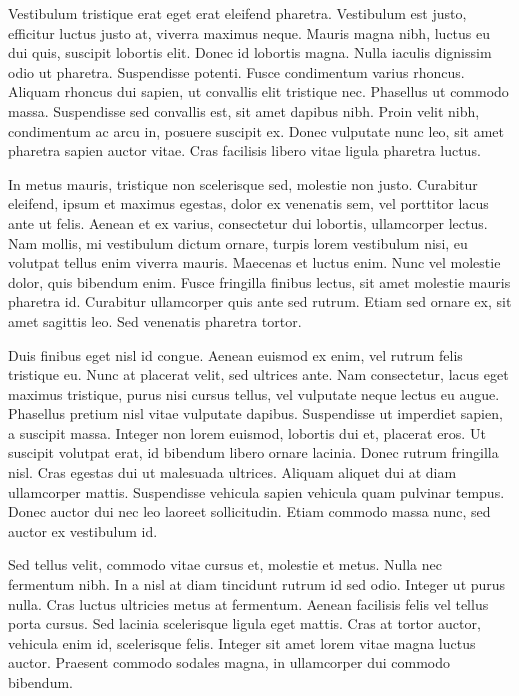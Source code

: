 Vestibulum tristique erat eget erat eleifend pharetra. Vestibulum est justo,
efficitur luctus justo at, viverra maximus neque. Mauris magna nibh, luctus eu
dui quis, suscipit lobortis elit. Donec id lobortis magna. Nulla iaculis
dignissim odio ut pharetra. Suspendisse potenti. Fusce condimentum varius
rhoncus. Aliquam rhoncus dui sapien, ut convallis elit tristique nec. Phasellus
ut commodo massa. Suspendisse sed convallis est, sit amet dapibus nibh. Proin
velit nibh, condimentum ac arcu in, posuere suscipit ex. Donec vulputate nunc
leo, sit amet pharetra sapien auctor vitae. Cras facilisis libero vitae ligula
pharetra luctus.

In metus mauris, tristique non scelerisque sed, molestie non justo. Curabitur
eleifend, ipsum et maximus egestas, dolor ex venenatis sem, vel porttitor lacus
ante ut felis. Aenean et ex varius, consectetur dui lobortis, ullamcorper
lectus. Nam mollis, mi vestibulum dictum ornare, turpis lorem vestibulum nisi,
eu volutpat tellus enim viverra mauris. Maecenas et luctus enim. Nunc vel
molestie dolor, quis bibendum enim. Fusce fringilla finibus lectus, sit amet
molestie mauris pharetra id. Curabitur ullamcorper quis ante sed rutrum. Etiam
sed ornare ex, sit amet sagittis leo. Sed venenatis pharetra tortor.

Duis finibus eget nisl id congue. Aenean euismod ex enim, vel rutrum felis
tristique eu. Nunc at placerat velit, sed ultrices ante. Nam consectetur, lacus
eget maximus tristique, purus nisi cursus tellus, vel vulputate neque lectus eu
augue. Phasellus pretium nisl vitae vulputate dapibus. Suspendisse ut imperdiet
sapien, a suscipit massa. Integer non lorem euismod, lobortis dui et, placerat
eros. Ut suscipit volutpat erat, id bibendum libero ornare lacinia. Donec
rutrum fringilla nisl. Cras egestas dui ut malesuada ultrices. Aliquam aliquet
dui at diam ullamcorper mattis. Suspendisse vehicula sapien vehicula quam
pulvinar tempus. Donec auctor dui nec leo laoreet sollicitudin. Etiam commodo
massa nunc, sed auctor ex vestibulum id.

Sed tellus velit, commodo vitae cursus et, molestie et metus. Nulla nec
fermentum nibh. In a nisl at diam tincidunt rutrum id sed odio. Integer ut
purus nulla. Cras luctus ultricies metus at fermentum. Aenean facilisis felis
vel tellus porta cursus. Sed lacinia scelerisque ligula eget mattis. Cras at
tortor auctor, vehicula enim id, scelerisque felis. Integer sit amet lorem
vitae magna luctus auctor. Praesent commodo sodales magna, in ullamcorper dui
commodo bibendum.

